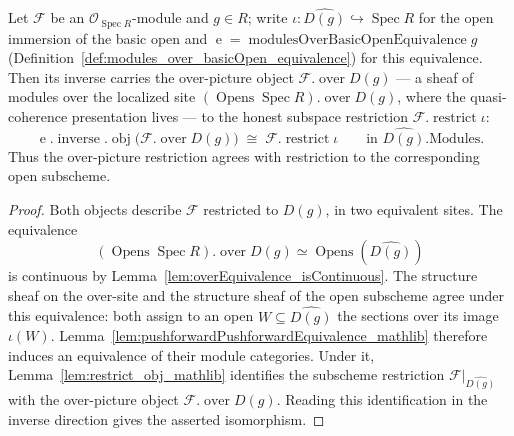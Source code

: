 \begin{lemma}\leanok
  \label{lem:restrict_over_compat}
  Let \(\mathcal{F}\) be an \(\mathcal{O}_{\operatorname{Spec} R}\)-module and \(g \in R\); write
  \(\iota : \widehat{D(g)} \hookrightarrow \operatorname{Spec} R\) for the open immersion of the basic
  open and \(\operatorname{e} = \operatorname{modulesOverBasicOpenEquivalence} g\)
  (Definition~\ref{def:modules_over_basicOpen_equivalence}) for this equivalence. Then its
  inverse carries the over-picture object \(\mathcal{F}.\operatorname{over} D(g)\) — a
  sheaf of modules over the localized site \((\operatorname{Opens} \operatorname{Spec}
  R).\operatorname{over} D(g)\), where the quasi-coherence presentation lives — to the honest subspace
  restriction \(\mathcal{F}.\operatorname{restrict} \iota\):
  \[
    \operatorname{e}.\operatorname{inverse}.\operatorname{obj}
      \bigl(\mathcal{F}.\operatorname{over} D(g)\bigr)
      \;\cong\; \mathcal{F}.\operatorname{restrict} \iota
    \qquad \text{in } \widehat{D(g)}.\mathrm{Modules}.
  \]
  Thus the over-picture restriction agrees with restriction to the corresponding open
  subscheme.
\end{lemma}
\begin{proof}
    \leanok
  Both objects describe \(\mathcal{F}\) restricted to \(D(g)\), in two equivalent
  sites. The equivalence
  \[
    (\operatorname{Opens}\operatorname{Spec}R).\operatorname{over}D(g)
      \simeq \operatorname{Opens}(\widehat{D(g)})
  \]
  is continuous by Lemma~\ref{lem:overEquivalence_isContinuous}. The structure sheaf
  on the over-site and the structure sheaf of the open subscheme agree under this
  equivalence: both assign to an open \(W\subseteq\widehat{D(g)}\) the sections over
  its image \(\iota(W)\). Lemma~\ref{lem:pushforwardPushforwardEquivalence_mathlib}
  therefore induces an equivalence of their module categories. Under it,
  Lemma~\ref{lem:restrict_obj_mathlib} identifies the subscheme restriction
  \(\mathcal F|_{\widehat{D(g)}}\) with the over-picture object
  \(\mathcal F.\operatorname{over}D(g)\). Reading this identification in the inverse
  direction gives the asserted isomorphism.
\end{proof}

